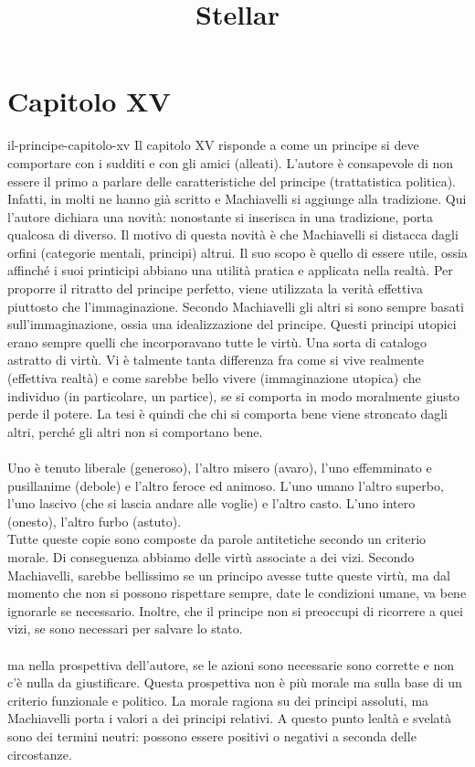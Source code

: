 \documentclass[preview]{standalone}
\begin{document}
\title{Stellar}
\genpage

\section{Capitolo XV}

\begin{snippet}{il-principe-capitolo-xv}
    Il capitolo XV risponde a come un principe si deve comportare
    con i sudditi e con gli amici (alleati).
    L'autore è consapevole di non essere il primo a parlare
    delle caratteristiche del principe (trattatistica politica).
    Infatti, in molti ne hanno già scritto e Machiavelli si
    aggiunge alla tradizione.
    Qui l'autore dichiara una novità: nonostante si inserisca in una tradizione,
    porta qualcosa di diverso.
    Il motivo di questa novità è che Machiavelli si distacca
    dagli orfini (categorie mentali, principi) altrui.
    Il suo scopo è quello di essere utile, ossia
    affinché i suoi printicipi abbiano una utilità pratica e applicata
    nella realtà.
    Per proporre il ritratto del principe perfetto, viene utilizzata
    la verità effettiva piuttosto che l'immaginazione.
    Secondo Machiavelli gli altri si sono sempre basati sull'immaginazione,
    ossia una idealizzazione del principe.
    Questi principi utopici erano sempre quelli che incorporavano tutte le virtù.
    Una sorta di catalogo astratto di virtù.
    Vi è talmente tanta differenza fra come si vive realmente (effettiva realtà)
    e come sarebbe bello vivere (immaginazione utopica) che
    individuo (in particolare, un partice), se si comporta in modo moralmente giusto
    perde il potere. La tesi è quindi che chi si comporta bene
    viene stroncato dagli altri, perché gli altri non si comportano bene.
    \\\\
    Uno è tenuto liberale (generoso), l'altro misero (avaro),
    l'uno effemminato e pusillanime (debole) e l'altro
    feroce ed animoso. L'uno umano l'altro superbo, l'uno lascivo (che si lascia andare alle voglie) e l'altro casto.
    L'uno intero (onesto), l'altro furbo (astuto).
    \\
    Tutte queste copie sono composte da parole antitetiche
    secondo un criterio morale. Di conseguenza abbiamo delle virtù associate a dei vizi.
    Secondo Machiavelli, sarebbe bellissimo se un principo avesse tutte queste virtù,
    ma dal momento che non si possono rispettare sempre, date le condizioni umane,
    va bene ignorarle se necessario.
    Inoltre, che il principe non si preoccupi di ricorrere a quei vizi,
    se sono necessari per salvare lo stato.
    \\\\
    ma nella prospettiva dell'autore, se le azioni sono necessarie
    sono corrette e non c'è nulla da giustificare.
    Questa prospettiva non è più morale ma sulla base di un criterio funzionale
    e politico.
    La morale ragiona su dei principi assoluti, ma Machiavelli porta i valori a
    dei principi relativi.
    A questo punto lealtà e svelatà sono dei termini neutri:
    possono essere positivi o negativi a seconda delle circostanze.
\end{snippet}
\end{document}
